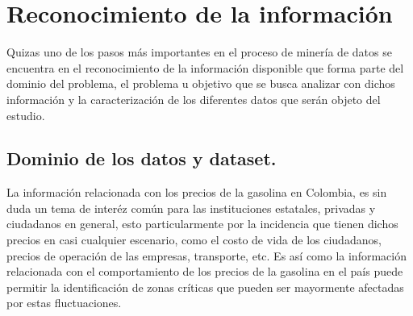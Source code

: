 \section{Reconocimiento de la información}
Quizas uno de los pasos más importantes  en el proceso de minería de datos se encuentra en el reconocimiento de la información disponible que forma parte del dominio del problema, el problema u objetivo que se busca analizar con dichos información y la caracterización de los diferentes datos que serán objeto del estudio.

 \subsection{Dominio de los datos y dataset.}
 La información relacionada con los precios de la gasolina en Colombia, es sin duda un tema de interéz común para las instituciones estatales, privadas y ciudadanos en general, esto particularmente por la incidencia que tienen dichos precios en casi cualquier escenario, como el costo de vida de los ciudadanos, precios de operación de las empresas, transporte, etc. Es así como la información relacionada con el comportamiento de los precios de la gasolina en el país puede permitir la identificación de zonas críticas que pueden ser mayormente afectadas por estas fluctuaciones.

